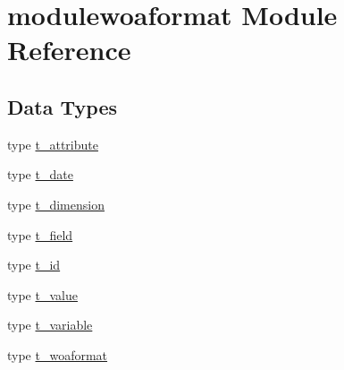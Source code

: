\hypertarget{namespacemodulewoaformat}{}\section{modulewoaformat Module Reference}
\label{namespacemodulewoaformat}
\subsection*{Data Types}
\begin{DoxyCompactItemize}
\item 
type \mbox{\hyperlink{structmodulewoaformat_1_1t__attribute}{t\+\_\+attribute}}
\item 
type \mbox{\hyperlink{structmodulewoaformat_1_1t__date}{t\+\_\+date}}
\item 
type \mbox{\hyperlink{structmodulewoaformat_1_1t__dimension}{t\+\_\+dimension}}
\item 
type \mbox{\hyperlink{structmodulewoaformat_1_1t__field}{t\+\_\+field}}
\item 
type \mbox{\hyperlink{structmodulewoaformat_1_1t__id}{t\+\_\+id}}
\item 
type \mbox{\hyperlink{structmodulewoaformat_1_1t__value}{t\+\_\+value}}
\item 
type \mbox{\hyperlink{structmodulewoaformat_1_1t__variable}{t\+\_\+variable}}
\item 
type \mbox{\hyperlink{structmodulewoaformat_1_1t__woaformat}{t\+\_\+woaformat}}
\end{DoxyCompactItemize}
